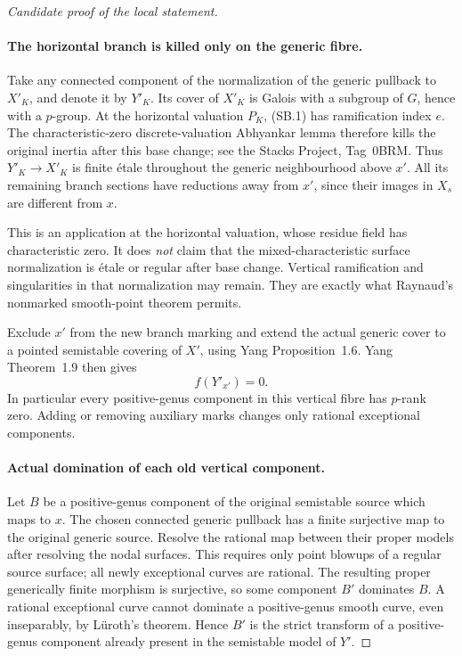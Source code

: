 \begin{proof}[Candidate proof of the local statement]
\paragraph{The horizontal branch is killed only on the generic fibre.}
Take any connected component of the normalization of the
generic pullback to \(X'_K\), and denote it by \(Y'_K\).
Its cover of \(X'_K\) is Galois with a subgroup of \(G\),
hence with a \(p\)-group. At the horizontal valuation
\(P_K\), (SB.1) has ramification index \(e\).
The characteristic-zero discrete-valuation Abhyankar lemma
therefore kills the original inertia after this base change;
see the Stacks Project, Tag~0BRM. Thus \(Y'_K\to X'_K\)
is finite \'etale throughout the generic neighbourhood
above \(x'\). All its remaining branch sections have
reductions away from \(x'\), since their images in \(X_s\)
are different from \(x\).

This is an application at the horizontal valuation, whose
residue field has characteristic zero. It does \emph{not}
claim that the mixed-characteristic surface normalization
is \'etale or regular after base change. Vertical ramification
and singularities in that normalization may remain.
They are exactly what Raynaud's nonmarked smooth-point
theorem permits.

Exclude \(x'\) from the new branch marking and extend the
actual generic cover to a pointed semistable covering of
\(X'\), using Yang Proposition~1.6. Yang Theorem~1.9
then gives
\[
                    f(Y'_{x'})=0.                        \tag{SB.3}
\]
In particular every positive-genus component in this
vertical fibre has \(p\)-rank zero. Adding or removing
auxiliary marks changes only rational exceptional components.

\paragraph{Actual domination of each old vertical component.}
Let \(B\) be a positive-genus component of the original
semistable source which maps to \(x\). The chosen connected
generic pullback has a finite surjective map to the original
generic source. Resolve the rational map between their proper
models after resolving the nodal surfaces. This requires
only point blowups of a regular source surface; all newly
exceptional curves are rational. The resulting proper
generically finite morphism is surjective, so some component
\(B'\) dominates \(B\). A rational exceptional curve
cannot dominate a positive-genus smooth curve, even
inseparably, by L\"uroth's theorem. Hence \(B'\) is the
strict transform of a positive-genus component already
present in the semistable model of \(Y'\).


\end{proof}
